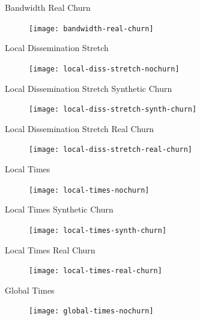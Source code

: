 \begin{frame}{Bandwidth Real Churn}
	\begin{figure}
		\texttt{[image: bandwidth-real-churn]}
	\end{figure}
\end{frame}

\begin{frame}{Local Dissemination Stretch}
	\begin{figure}
		\texttt{[image: local-diss-stretch-nochurn]}
	\end{figure}
\end{frame}

\begin{frame}{Local Dissemination Stretch Synthetic Churn}
	\begin{figure}
		\texttt{[image: local-diss-stretch-synth-churn]}
	\end{figure}
\end{frame}

\begin{frame}{Local Dissemination Stretch Real Churn}
	\begin{figure}
		\texttt{[image: local-diss-stretch-real-churn]}
	\end{figure}
\end{frame}

\begin{frame}{Local Times}
	\begin{figure}
		\texttt{[image: local-times-nochurn]}
	\end{figure}
\end{frame}

\begin{frame}{Local Times Synthetic Churn}
	\begin{figure}
		\texttt{[image: local-times-synth-churn]}
	\end{figure}
\end{frame}

\begin{frame}{Local Times Real Churn}
	\begin{figure}
		\texttt{[image: local-times-real-churn]}
	\end{figure}
\end{frame}

\begin{frame}{Global Times}
	\begin{figure}
		\texttt{[image: global-times-nochurn]}
	\end{figure}
\end{frame}

